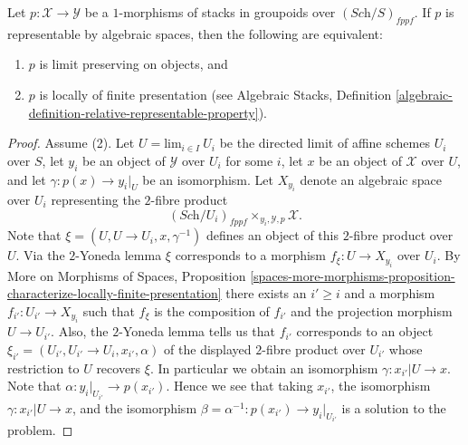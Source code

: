 \begin{lemma}
\label{lemma-representable-by-spaces-limit-preserving}
Let $p : \mathcal{X} \to \mathcal{Y}$ be a $1$-morphisms of stacks in groupoids
over $(\textit{Sch}/S)_{fppf}$. If $p$ is
representable by algebraic spaces, then the following are equivalent:
\begin{enumerate}
\item $p$ is limit preserving on objects, and
\item $p$ is locally of finite presentation (see
Algebraic Stacks,
Definition \ref{algebraic-definition-relative-representable-property}).
\end{enumerate}
\end{lemma}

\begin{proof}
Assume (2). Let $U = \text{lim}_{i \in I}\ U_i$ be the directed limit
of affine schemes $U_i$ over $S$, let $y_i$ be an object of $\mathcal{Y}$
over $U_i$ for some $i$, let $x$ be an object of $\mathcal{X}$ over $U$,
and let $\gamma : p(x) \to y_i|_U$ be an isomorphism. Let
$X_{y_i}$ denote an algebraic space over $U_i$ representing the $2$-fibre
product
$$
(\textit{Sch}/U_i)_{fppf} \times_{y_i, \mathcal{Y}, p} \mathcal{X}.
$$
Note that $\xi = (U, U \to U_i, x, \gamma^{-1})$ defines an object of
this $2$-fibre product over $U$. Via the $2$-Yoneda lemma $\xi$ corresponds
to a morphism $f_\xi : U \to X_{y_i}$ over $U_i$. By
More on Morphisms of Spaces, Proposition
\ref{spaces-more-morphisms-proposition-characterize-locally-finite-presentation}
there exists an $i' \geq i$ and a morphism $f_{i'} : U_{i'} \to X_{y_i}$
such that $f_\xi$ is the composition of $f_{i'}$ and the projection
morphism $U \to U_{i'}$. Also, the $2$-Yoneda lemma tells us that
$f_{i'}$ corresponds to an object
$\xi_{i'} = (U_{i'}, U_{i'} \to U_i, x_{i'}, \alpha)$ of
the displayed $2$-fibre product over $U_{i'}$ whose restriction to
$U$ recovers $\xi$. In particular we obtain an isomorphism
$\gamma : x_{i'}|U \to x$. Note that $\alpha : y_i|_{U_{i'}} \to p(x_{i'})$.
Hence we see that taking $x_{i'}$, the isomorphism
$\gamma : x_{i'}|U \to x$, and the isomorphism
$\beta = \alpha^{-1} : p(x_{i'}) \to y_i|_{U_{i'}}$
is a solution to the problem.


\end{proof}
